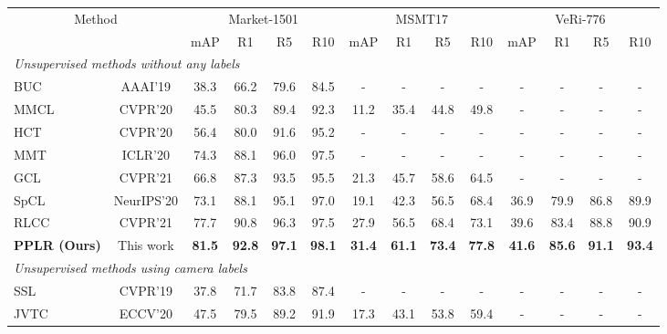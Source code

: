 \documentclass[10pt,twocolumn,letterpaper]{article}
\begin{document}
{    \begin{table*}[!htbp]
    	\centering	
    	\begin{adjustbox}{max width=\textwidth}
    	\footnotesize
    	\begin{tabular}{l|c|cccc|cccc|cccc}
    	\hline
    		\multicolumn{2}{c|}{\multirow{2}{*}{Method}} & \multicolumn{4}{c|}{Market-1501} & \multicolumn{4}{c|}{MSMT17} & \multicolumn{4}{c}{VeRi-776} \\ \cline{3-14} 
     		\multicolumn{2}{c|}{} & mAP & R1 & R5 & R10 & mAP & R1 & R5 & R10 & mAP & R1 & R5 & R10 \\\hline
    		\multicolumn{14}{l}{\textit{Unsupervised methods without any labels}} \\ \hline
    		BUC~\cite{lin2019aBottom} & AAAI'19   & 38.3 & 66.2 & 79.6 & 84.5 & - & - & - & - & - & - & - & - \\
    		MMCL~\cite{wang2020unsupervised} & CVPR'20  & 45.5 & 80.3 & 89.4 & 92.3 & 11.2 & 35.4 & 44.8 & 49.8 & - & - & - & - \\
    		HCT~\cite{zeng2020hierarchical} & CVPR'20   & 56.4 & 80.0 & 91.6 & 95.2 & - & - & - & - & - & - & - & - \\
    		MMT~\cite{ge2020mutual} & ICLR'20 & 74.3 & 88.1 & 96.0 & 97.5 & - & - & - & - & - & - & - & -\\
    		GCL~\cite{chen2021joint} & CVPR'21 & 66.8 & 87.3 & 93.5 & 95.5 & 21.3 & 45.7 & 58.6 & 64.5 & - & - & - & -\\
    		SpCL~\cite{ge2020selfpaced} & NeurIPS'20 & 73.1 & 88.1 & 95.1 & 97.0 & 19.1 & 42.3 & 56.5 & 68.4 & 36.9 & 79.9 & 86.8 & 89.9 \\
    		RLCC~\cite{zhang2021refining} & CVPR'21 & {77.7} & {90.8} & {96.3} & {97.5} & {27.9} & {56.5} & 68.4 & 73.1 & 39.6 & 83.4 & 88.8 & 90.9 \\
    		\textbf{PPLR (Ours)} & This work 
    		& \textbf{81.5} & \textbf{92.8} & \textbf{97.1} & \textbf{98.1} 
            & \textbf{31.4} & \textbf{61.1} & \textbf{73.4} & \textbf{77.8}
            & \textbf{41.6} & \textbf{85.6} & \textbf{91.1} & \textbf{93.4} \\
    		\hline
    		\multicolumn{14}{l}{\textit{Unsupervised methods using camera labels}} \\ \hline
    		SSL~\cite{lin2020unsupervised} & CVPR'19   & 37.8 & 71.7 & 83.8 & 87.4 & - & - & - & - & - & - & - & -\\
    		JVTC~\cite{li2020joint} & ECCV'20 & 47.5 & 79.5 & 89.2 & 91.9 & 17.3 & 43.1 & 53.8 & 59.4 & - & - & - & - \\

\end{tabular}
\end{adjustbox}
\end{table*}}
\end{document}
